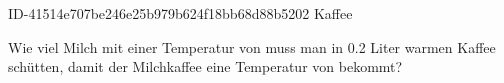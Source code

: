 \begin{exercise}
      {ID-41514e707be246e25b979b624f18bb68d88b5202}
      {Kaffee}
  \ifproblem\problem\par
    Wie viel Milch mit einer Temperatur von  muss man in \num{0.2} Liter
     warmen Kaffee schütten, damit der Milchkaffee eine Temperatur
    von  bekommt?
  \fi
\end{exercise}
